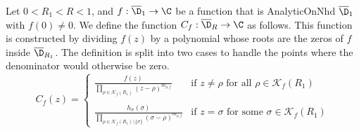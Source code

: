 \begin{definition}[C function] \label{def:C_function} \leanok
Let $0<R_1<R<1$, and $f:\overline{\D}_1\to\C$ be a function that is AnalyticOnNhd $\overline{\D}_1$ with $f(0)\neq0$. We define the function $C_f:\overline{\D}_R\to\C$ as follows. This function is constructed by dividing $f(z)$ by a polynomial whose roots are the zeros of $f$ inside $\overline{\D}_{R_1}$. The definition is split into two cases to handle the points where the denominator would otherwise be zero.
\[ C_f(z) = \begin{cases} \displaystyle\frac{f(z)}{\prod_{\rho\in\mathcal{K}_f(R_1)}(z-\rho)^{m_{\rho,f}}} & \text{if } z \neq \rho \text{ for all } \rho \in \mathcal{K}_f(R_1) \\ \\ \displaystyle\frac{h_\sigma(\sigma)}{\prod_{\rho\in\mathcal{K}_f(R_1) \setminus\{\sigma\}}(\sigma-\rho)^{m_{\rho,f}}} & \text{if } z = \sigma \text{ for some } \sigma \in \mathcal{K}_f(R_1) \end{cases} \]
\end{definition}

